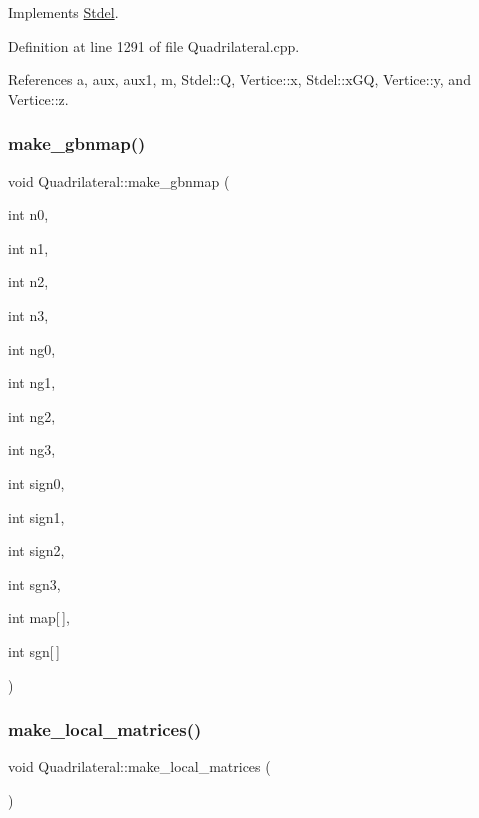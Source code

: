 Implements \hyperlink{classStdel_a953ff994c1bb423245aff079932c648f}{Stdel}.



Definition at line 1291 of file Quadrilateral.\+cpp.



References a, aux, aux1, m, Stdel\+::Q, Vertice\+::x, Stdel\+::x\+GQ, Vertice\+::y, and Vertice\+::z.

\mbox{\label{classQuadrilateral_a5f3b8528600d00c640376f9170ca4b59}} 
\subsubsection{\texorpdfstring{make\+\_\+gbnmap()}{make\_gbnmap()}}
{\footnotesize\ttfamily void Quadrilateral\+::make\+\_\+gbnmap (\begin{DoxyParamCaption}\item[{int}]{n0,  }\item[{int}]{n1,  }\item[{int}]{n2,  }\item[{int}]{n3,  }\item[{int}]{ng0,  }\item[{int}]{ng1,  }\item[{int}]{ng2,  }\item[{int}]{ng3,  }\item[{int}]{sign0,  }\item[{int}]{sign1,  }\item[{int}]{sign2,  }\item[{int}]{sgn3,  }\item[{int}]{map\mbox{[}$\,$\mbox{]},  }\item[{int}]{sgn\mbox{[}$\,$\mbox{]} }\end{DoxyParamCaption})}

\mbox{\label{classQuadrilateral_a250590faeb6a0218430f02ee040a1818}} 
\subsubsection{\texorpdfstring{make\+\_\+local\+\_\+matrices()}{make\_local\_matrices()}}
{\footnotesize\ttfamily void Quadrilateral\+::make\+\_\+local\+\_\+matrices (\begin{DoxyParamCaption}{ }\end{DoxyParamCaption})}



